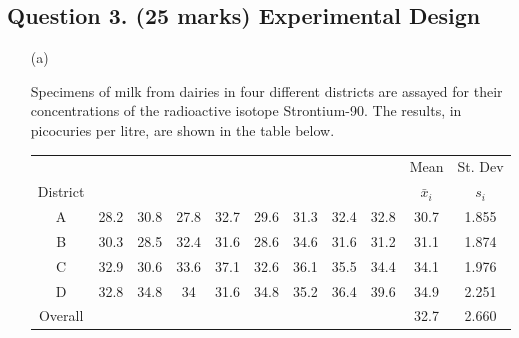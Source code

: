 \documentclass[a4paper,12pt]{article}
\begin{document}
\subsection*{Question 3. (25 marks) Experimental Design }
\begin{itemize}
	\item [(a)]

Specimens of milk from dairies in four different districts are assayed for their concentrations of the radioactive isotope Strontium-90. 
The results, in picocuries per litre, are shown in the table below.


	\begin{center}
		\begin{tabular}{|c|cccccccc|c|c|}
			\hline  

	 & &&&&&&& & Mean & St. Dev \\  
		District	&  &&&&&&&& $\bar{x}_i$ & $s_{i}$ \\  
		\hline \hline
A&	28.2	&	30.8	&	27.8	&	32.7	&	29.6	&	31.3	&	32.4	&	32.8	&	30.7	&	1.855	\\ \hline
B&	30.3	&	28.5	&	32.4	&	31.6	&	28.6	&	34.6	&	31.6	&	31.2	&	31.1	&	1.874	\\ \hline
C&	32.9	&	30.6	&	33.6	&	37.1	&	32.6	&	36.1	&	35.5	&	34.4	&	34.1	&	1.976	\\ \hline
D&	32.8	&	34.8	&	34	&	31.6	&	34.8	&	35.2	&	36.4	&	39.6	&	34.9	&	2.251	\\ \hline \hline
			Overall & &&&&&&&&	32.7	&	2.660	\\ \hline
		\end{tabular} 
	\end{center}




\end{itemize}
\end{document}
